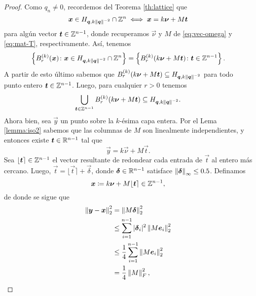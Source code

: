 \begin{proof}
	Como $q_n \neq 0$, recordemos del Teorema \eqref{th:lattice} que
	\begin{equation*}
		\boldsymbol{x} \in H_{\boldsymbol{q}, k\left\lVert \boldsymbol{q} \right\rVert^{-2}} \cap \mathbb{Z}^n \iff \boldsymbol{x} = k\boldsymbol{\nu} + M\boldsymbol{t}
	\end{equation*}
	para algún vector $\boldsymbol{t} \in \mathbb{Z}^{n-1}$, donde recuperamos $\vec{\nu}$ y $M$ de
	\eqref{eq:vec-omega} y \eqref{eq:mat-T}, respectivamente. Así, tenemos
	\begin{equation*}
		\left\lbrace B_r^{(k)}(\boldsymbol{x}) \colon \boldsymbol{x} \in H_{\boldsymbol{q}, k\left\lVert \boldsymbol{q} \right\rVert^{-2}} \cap
			\mathbb{Z}^n \right\rbrace
			=
		\left\lbrace B_r^{(k)}(k\boldsymbol{\nu} + M\boldsymbol{t}) \colon \boldsymbol{t} \in \mathbb{Z}^{n-1} \right\rbrace.
	\end{equation*}
	A partir de esto último sabemos que $B_r^{(k)}(k\boldsymbol{\nu} + M\boldsymbol{t}) \subseteq H_{\boldsymbol{q},
	k\left\lVert \boldsymbol{q} \right\rVert^{-2}}$ para todo punto entero $\boldsymbol{t} \in \mathbb{Z}^{n-1}$. Luego, para cualquier $r >
	0$ tenemos
	\begin{equation}
		\label{eq:ball-cover:1}
		\bigcup_{\boldsymbol{t} \in \mathbb{Z}^{n-1}}B_r^{(k)}(k\boldsymbol{\nu} + M\boldsymbol{t}) \subseteq
		H_{\boldsymbol{q}, k\left\lVert \boldsymbol{q} \right\rVert^{-2}}.
	\end{equation}
	Ahora bien, sea $\vec{y}$ un punto sobre la $k$-ésima capa entera. Por el Lema \ref{lemma:iso2}
	sabemos que las columnas de $M$ son linealmente independientes, y entonces existe $\boldsymbol{t} \in
	\mathbb{R}^{n-1}$ tal que
	\begin{equation*}
		\vec{y} = k\vec{\nu} + M\vec{t}.
	\end{equation*}
	Sea $\lfloor \boldsymbol{t} \rceil \in \mathbb{Z}^{n-1}$ el vector resultante de redondear cada entrada de
	$\vec{t}$ al entero más cercano. Luego, $\vec{t} = \lfloor \vec{t} \rceil + \vec{\delta}$,
	donde $\boldsymbol{\delta} \in \mathbb{R}^{n-1}$ satisface $\left\lVert \boldsymbol{\delta} \right\rVert_{\infty} \leq 0.5$. Definamos
	\begin{equation*}
		\boldsymbol{x} \coloneq k\boldsymbol{\nu} + M\lfloor \boldsymbol{t} \rceil \in \mathbb{Z}^{n-1},
	\end{equation*}
	de donde se sigue que
	\begin{align}
		\left\lVert \boldsymbol{y} - \boldsymbol{x} \right\rVert_2^{2} 
		&= \left\lVert M\boldsymbol{\delta} \right\rVert_{2}^{2} \nonumber \\
		&\leq \sum_{i=1}^{n-1}|\boldsymbol{\delta}_i|^2 \left\lVert M\boldsymbol{e}_i \right\rVert_2^{2} \nonumber \\
		&\leq \frac{1}{4}\sum_{i=1}^{n-1} \left\lVert M\boldsymbol{e}_i \right\rVert_2^{2} \label{eq:alt-M-bound} \\
		&= \frac{1}{4}\left\lVert M \right\rVert_F^2, \nonumber
	\end{align}

\end{proof}
